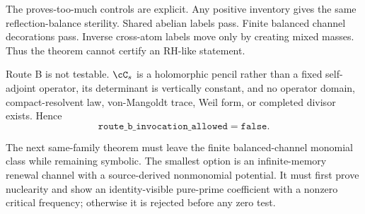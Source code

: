 The proves-too-much controls are explicit.  Any positive inventory gives the
same reflection-balance sterility.  Shared abelian labels pass.  Finite
balanced channel decorations pass.  Inverse cross-atom labels move only by
creating mixed masses.  Thus the theorem cannot certify an RH-like statement.

Route B is not testable.  $\cC_s$ is a holomorphic pencil rather than a fixed
self-adjoint operator, its determinant is vertically constant, and no
operator domain, compact-resolvent law, von-Mangoldt trace, Weil form, or
completed divisor exists.  Hence
\[
 \mathtt{route\_b\_invocation\_allowed=false}.
\]

The next same-family theorem must leave the finite balanced-channel monomial
class while remaining symbolic.  The smallest option is an infinite-memory
renewal channel with a source-derived nonmonomial potential.  It must first
prove nuclearity and show an identity-visible pure-prime coefficient with a
nonzero critical frequency; otherwise it is rejected before any zero test.
